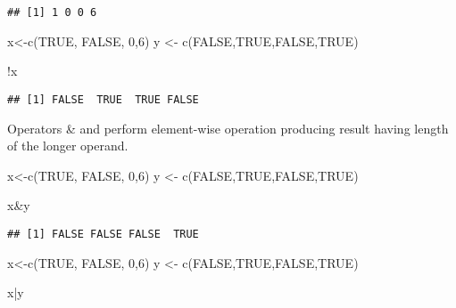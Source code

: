 \documentclass[
]{article}
\newenvironment{Shaded}{\begin{snugshade}}{\end{snugshade}}
\newcommand{\ConstantTok}[1]{\textcolor[rgb]{0.00,0.00,0.00}{#1}}
\newcommand{\DecValTok}[1]{\textcolor[rgb]{0.00,0.00,0.81}{#1}}
\newcommand{\FunctionTok}[1]{\textcolor[rgb]{0.00,0.00,0.00}{#1}}
\newcommand{\NormalTok}[1]{#1}
\newcommand{\OtherTok}[1]{\textcolor[rgb]{0.56,0.35,0.01}{#1}}
\newcommand{\SpecialCharTok}[1]{\textcolor[rgb]{0.00,0.00,0.00}{#1}}
\begin{document}
\begin{verbatim}
## [1] 1 0 0 6
\end{verbatim}

\begin{Shaded}
\begin{Highlighting}[]
\NormalTok{x}\OtherTok{\textless{}{-}}\FunctionTok{c}\NormalTok{(}\ConstantTok{TRUE}\NormalTok{, }\ConstantTok{FALSE}\NormalTok{, }\DecValTok{0}\NormalTok{,}\DecValTok{6}\NormalTok{)}
\NormalTok{y }\OtherTok{\textless{}{-}} \FunctionTok{c}\NormalTok{(}\ConstantTok{FALSE}\NormalTok{,}\ConstantTok{TRUE}\NormalTok{,}\ConstantTok{FALSE}\NormalTok{,}\ConstantTok{TRUE}\NormalTok{)}

\SpecialCharTok{!}\NormalTok{x}
\end{Highlighting}
\end{Shaded}

\begin{verbatim}
## [1] FALSE  TRUE  TRUE FALSE
\end{verbatim}

Operators \& and \textbar{} perform element-wise operation producing
result having length of the longer operand.

\begin{Shaded}
\begin{Highlighting}[]
\NormalTok{x}\OtherTok{\textless{}{-}}\FunctionTok{c}\NormalTok{(}\ConstantTok{TRUE}\NormalTok{, }\ConstantTok{FALSE}\NormalTok{, }\DecValTok{0}\NormalTok{,}\DecValTok{6}\NormalTok{)}
\NormalTok{y }\OtherTok{\textless{}{-}} \FunctionTok{c}\NormalTok{(}\ConstantTok{FALSE}\NormalTok{,}\ConstantTok{TRUE}\NormalTok{,}\ConstantTok{FALSE}\NormalTok{,}\ConstantTok{TRUE}\NormalTok{)}

\NormalTok{x}\SpecialCharTok{\&}\NormalTok{y}
\end{Highlighting}
\end{Shaded}

\begin{verbatim}
## [1] FALSE FALSE FALSE  TRUE
\end{verbatim}

\begin{Shaded}
\begin{Highlighting}[]
\NormalTok{x}\OtherTok{\textless{}{-}}\FunctionTok{c}\NormalTok{(}\ConstantTok{TRUE}\NormalTok{, }\ConstantTok{FALSE}\NormalTok{, }\DecValTok{0}\NormalTok{,}\DecValTok{6}\NormalTok{)}
\NormalTok{y }\OtherTok{\textless{}{-}} \FunctionTok{c}\NormalTok{(}\ConstantTok{FALSE}\NormalTok{,}\ConstantTok{TRUE}\NormalTok{,}\ConstantTok{FALSE}\NormalTok{,}\ConstantTok{TRUE}\NormalTok{)}

\NormalTok{x}\SpecialCharTok{|}\NormalTok{y}
\end{Highlighting}
\end{Shaded}
\end{document}
